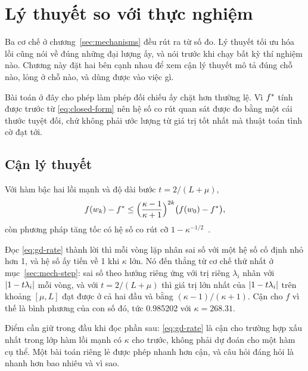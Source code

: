 \chapter{Lý thuyết so với thực nghiệm}
\label{sec:theory}

Ba cơ chế ở chương~\ref{sec:mechanisms} đều rút ra từ số đo. Lý thuyết tối ưu hóa
lồi cũng nói về đúng những đại lượng ấy, và nói trước khi chạy bất kỳ thí nghiệm
nào. Chương này đặt hai bên cạnh nhau để xem cận lý thuyết mô tả đúng chỗ nào,
lỏng ở chỗ nào, và dùng được vào việc gì.

Bài toán ở đây cho phép làm phép đối chiếu ấy chặt hơn thường lệ. Vì $f^{*}$
tính được trước từ \eqref{eq:closed-form} nên hệ số co rút quan sát được đo bằng
một cái thước tuyệt đối, chứ không phải ước lượng từ giá trị tốt nhất mà thuật
toán tình cờ đạt tới.

\section{Cận lý thuyết}
\label{sec:theory-bound}

Với hàm bậc hai lồi mạnh và độ dài bước $t = 2/(L+\mu)$,
%
\begin{equation}
  \label{eq:gd-rate}
  f(w_k) - f^{*} \le \Bigl( \frac{\kappa - 1}{\kappa + 1} \Bigr)^{2k}
                      \bigl( f(w_0) - f^{*} \bigr) ,
\end{equation}
%
còn phương pháp tăng tốc có hệ số co rút cỡ $1 - \kappa^{-1/2}$~\cite{nesterov2018lectures}.

Đọc \eqref{eq:gd-rate} thành lời thì mỗi vòng lặp nhân sai số với một hệ số cố
định nhỏ hơn 1, và hệ số ấy tiến về 1 khi $\kappa$ lớn. Nó đến thẳng từ cơ chế
thứ nhất ở mục~\ref{sec:mech-step}: sai số theo hướng riêng ứng với trị riêng
$\lambda_i$ nhân với $\lvert1 - t\lambda_i\rvert$ mỗi vòng, và với $t = 2/(L+\mu)$ thì
giá trị lớn nhất của $\lvert1 - t\lambda_i\rvert$ trên khoảng $[\mu, L]$ đạt được ở cả
hai đầu và bằng $(\kappa-1)/(\kappa+1)$. Cận cho $f$ vì thế là bình phương của
con số đó, tức \num{0.985202} với $\kappa = \num{268.31}$.

Điểm cần giữ trong đầu khi đọc phần sau: \eqref{eq:gd-rate} là cận cho trường hợp
xấu nhất trong lớp hàm lồi mạnh có $\kappa$ cho trước, không phải dự đoán cho một
hàm cụ thể. Một bài toán riêng lẻ được phép nhanh hơn cận, và câu hỏi đáng hỏi là
nhanh hơn bao nhiêu và vì sao.

